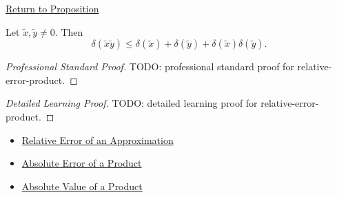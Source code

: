 \newpage
{}
\label{prf:relative-error-product}

\begin{remark*}[Return]
\hyperref[prop:relative-error-product]{Return to Proposition}
\end{remark*}

\begin{proposition*}
Let $\widetilde{x},\widetilde{y}\neq 0$. Then
\[
  \delta(\widetilde{x}\widetilde{y})
  \leq
  \delta(\widetilde{x})
  +
  \delta(\widetilde{y})
  +
  \delta(\widetilde{x})\delta(\widetilde{y}).
\]
\end{proposition*}

\begin{proof}[Professional Standard Proof]
\LRAProofBodyStart
TODO: professional standard proof for relative-error-product.
\end{proof}

\begin{proof}[Detailed Learning Proof]
\LRAProofBodyStart
TODO: detailed learning proof for relative-error-product.
\end{proof}

\begin{remark*}
\end{remark*}

\begin{dependencies}
\begin{itemize}
  \item \hyperref[def:relative-error-approximation]{Relative Error of an Approximation}
  \item \hyperref[thm:absolute-error-product]{Absolute Error of a Product}
  \item \hyperref[thm:absolute-value-product]{Absolute Value of a Product}
\end{itemize}
\end{dependencies}

\clearpage
